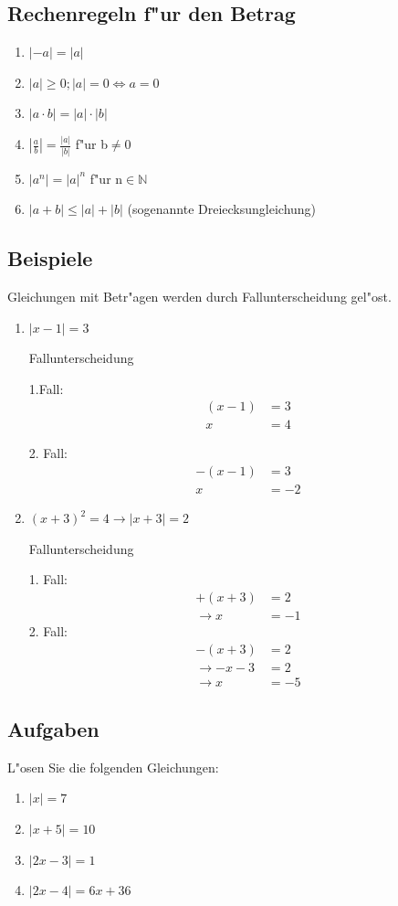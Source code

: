 \subsection{Rechenregeln f"ur den Betrag}
\begin{enumerate}
\item $|-a|=|a|$
\item $|a|\geq0; |a|=0\Leftrightarrow a=0$
\item $|a\cdot b|=|a|\cdot |b|$
\item $|\frac{a}{b}|=\frac{|a|}{|b|}$ f"ur b$\neq0$
\item $|a^n|=|a|^n$ f"ur n$\in\mathbb{N}$
\item $|a+b|\leq|a|+|b|$ (sogenannte Dreiecksungleichung)
\end{enumerate}
\subsection{Beispiele}
Gleichungen mit Betr"agen werden durch Fallunterscheidung gel"ost.
\begin{enumerate}
 \item $ | x-1 | = 3 $

Fallunterscheidung

1.Fall:
\begin{align*}
  (x - 1) &= 3 \\
  x &= 4
\end{align*}

2. Fall:
\begin{align*}
-(x - 1) &= 3 \\
 x &= -2
\end{align*}



\item $(x + 3)^2 = 4   \rightarrow | x+3 | = 2$
   
Fallunterscheidung

1. Fall:
\begin{align*}
+(x + 3) &= 2 \\
\rightarrow x &= -1
\end{align*}
2. Fall:
\begin{align*}
-(x + 3) &= 2 \\
\rightarrow -x - 3 &= 2\\
 \rightarrow x &= -5
\end{align*}

\end{enumerate}

\subsection{Aufgaben}
L"osen Sie die folgenden Gleichungen: 
\begin{enumerate}
\item $|x| = 7$
\item $| x+5 | = 10$
\item $| 2x-3 | = 1$
\item $| 2x-4| = 6x+36$
\end{enumerate}
